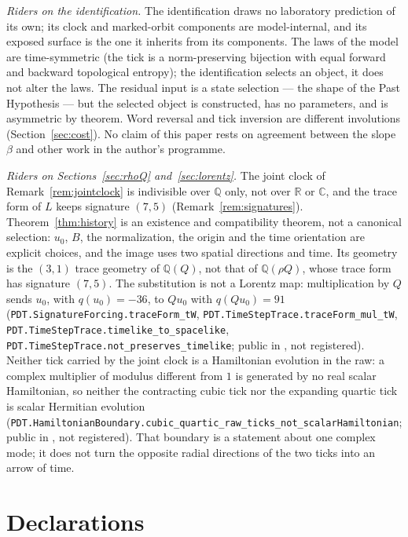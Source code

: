 \documentclass[11pt]{amsart}
\theoremstyle{plain}
\theoremstyle{definition}
\theoremstyle{remark}
\begin{document}
\emph{Riders on the identification.} The identification draws no laboratory prediction of
its own; its clock and marked-orbit components are model-internal, and its exposed surface is
the one it inherits from its components. The laws of the model are time-symmetric (the tick is
a norm-preserving bijection with equal forward and backward topological entropy); the
identification selects an object, it does not alter the laws. The residual input is a state
selection --- the shape of the Past Hypothesis --- but the selected object is constructed, has
no parameters, and is asymmetric by theorem. Word reversal and tick inversion are different
involutions (Section~\ref{sec:cost}). No claim of this paper rests on agreement between the
slope $\beta$ and other work in the author's programme.

\emph{Riders on Sections~\ref{sec:rhoQ} and~\ref{sec:lorentz}.} The joint clock of
Remark~\ref{rem:jointclock} is indivisible over $\mathbb{Q}$ only, not over $\mathbb{R}$ or
$\mathbb{C}$, and the trace form of $L$ keeps signature $(7,5)$
(Remark~\ref{rem:signatures}). Theorem~\ref{thm:history} is an existence and compatibility
theorem, not a canonical selection: $u_0$, $B$, the normalization, the origin and the time
orientation are explicit choices, and the image uses two spatial directions and time. Its
geometry is the $(3,1)$ trace geometry of $\mathbb{Q}(Q)$, not that of $\mathbb{Q}(\rho Q)$,
whose trace form has signature $(7,5)$. The substitution is not a Lorentz map: multiplication
by $Q$ sends $u_0$, with $q(u_0) = -36$, to $Qu_0$ with $q(Qu_0) = 91$
(\texttt{PDT.SignatureForcing.traceForm\_tW}, \texttt{PDT.TimeStepTrace.traceForm\_mul\_tW},
\texttt{PDT.TimeStepTrace.timelike\_to\_spacelike},
\texttt{PDT.TimeStepTrace.not\_preserves\_timelike}; public in \cite{pdtlean}, not
registered). Neither tick carried by the joint clock is a Hamiltonian evolution in the raw:
a complex multiplier of modulus different from $1$ is generated by no real scalar
Hamiltonian, so neither the contracting cubic tick nor the expanding quartic tick is scalar
Hermitian evolution
(\texttt{PDT.HamiltonianBoundary.cubic\_quartic\_raw\_ticks\_not\_scalarHamiltonian}; public in
\cite{pdtlean}, not registered). That boundary is a statement about one complex mode; it does
not turn the opposite radial directions of the two ticks into an arrow of time.

\section{Declarations}
\label{app:decls}
\begingroup\sloppy
\end{document}
